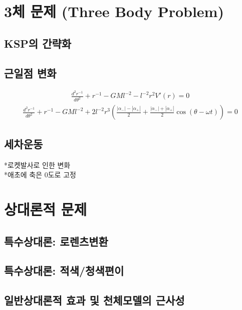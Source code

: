 \documentclass[9pt]{amsbook}
\begin{document}
\chapter{3체 문제 (Three Body Problem)}
\section{KSP의 간략화}
\section{근일점 변화}
\begin{align}
	\frac{d^2r^{-1}}{d\theta^2}+r^{-1}-GMl^{-2}-l^{-2}r^2V'(r) = 0
\end{align}
\begin{align}
	\frac{d^2r^{-1}}{d\theta^2}+r^{-1}-GMl^{-2}+2 l^{-2}r^3 \left(\frac{|\alpha_-| -|\alpha_+|}{2}+\frac{|\alpha_-| +|\alpha_+|}{2}\cos(\theta-\omega t)\right)= 0
\end{align}


\section{세차운동}
*로켓발사로 인한 변화
\\*애초에 축은 0도로 고정
\chapter{상대론적 문제}
\section{특수상대론: 로렌츠변환}
\section{특수상대론: 적색/청색편이}
\section{일반상대론적 효과 및 천체모델의 근사성}



\backmatter
\backpage
\end{document}
